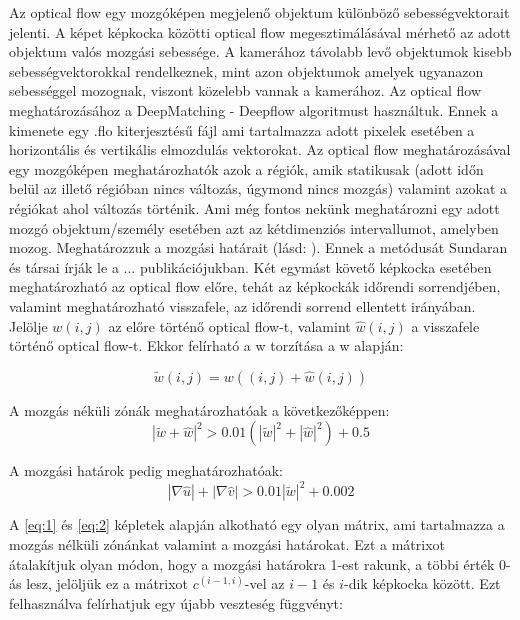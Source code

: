 \documentclass[12pt, a4paper, oneside]{book}
\theoremstyle{tetel}
\begin{document}
Az optical flow egy mozgóképen megjelenő objektum különböző sebességvektorait jelenti. A képet képkocka közötti optical flow megesztimálásával mérhető az adott objektum valós mozgási sebessége. A kamerához távolabb levő objektumok kisebb sebességvektorokkal rendelkeznek, mint azon objektumok amelyek ugyanazon sebességgel mozognak, viszont közelebb vannak a kamerához\cite{34}.
Az optical flow meghatározásához a DeepMatching - Deepflow algoritmust használtuk. Ennek a kimenete egy .flo kiterjesztésű fájl ami tartalmazza adott pixelek esetében a horizontális és vertikális elmozdulás vektorokat.
\newline
\indent
Az optical flow meghatározásával egy mozgóképen meghatározhatók azok a régiók, amik statikusak (adott időn belül az illető régióban nincs változás, úgymond nincs mozgás) valamint azokat a régiókat ahol változás történik. Ami még fontos nekünk meghatározni egy adott mozgó objektum/személy esetében azt az kétdimenziós intervallumot, amelyben mozog. Meghatározzuk a mozgási határait (lásd: ). Ennek a metódusát Sundaran és társai írják le a ... publikációjukban.
\newline
\indent
Két egymást követő képkocka esetében meghatározható az optical flow előre, tehát az képkockák időrendi sorrendjében, valamint meghatározható visszafele, az időrendi sorrend ellentett irányában. Jelölje \(w(i, j)\) az előre történő optical flow-t, valamint \(\hat{w}(i, j)\) a visszafele történő optical flow-t. Ekkor felírható a w torzítása a w alapján:

\begin{equation}
\tilde{w}(i, j) = w((i, j) + \hat{w}(i, j))
\end{equation}

A mozgás néküli zónák meghatározhatóak a következőképpen:
\begin{equation} \label{eq:1}
|\tilde{w} + \hat{w}|^2 > 0.01(|\tilde{w}|^2 + |\hat{w}|^2) + 0.5
\end{equation}

A mozgási határok pedig meghatározhatóak:
\begin{equation} \label{eq:2}
|\nabla\hat{u}| + |\nabla\hat{v}| > 0.01|\tilde{w}|^2 + 0.002
\end{equation}

A \ref{eq:1} és \ref{eq:2} képletek alapján alkotható egy olyan mátrix, ami tartalmazza a mozgás nélküli zónánkat valamint a mozgási határokat. Ezt a mátrixot átalakítjuk olyan módon, hogy a mozgási határokra 1-est rakunk, a többi érték 0-ás lesz, jelöljük ez a mátrixot \(c^{(i-1,i)}\)-vel az \(i-1\) és \(i\)-dik képkocka között. Ezt felhasználva felírhatjuk egy újabb veszteség függvényt: 
\end{document}
